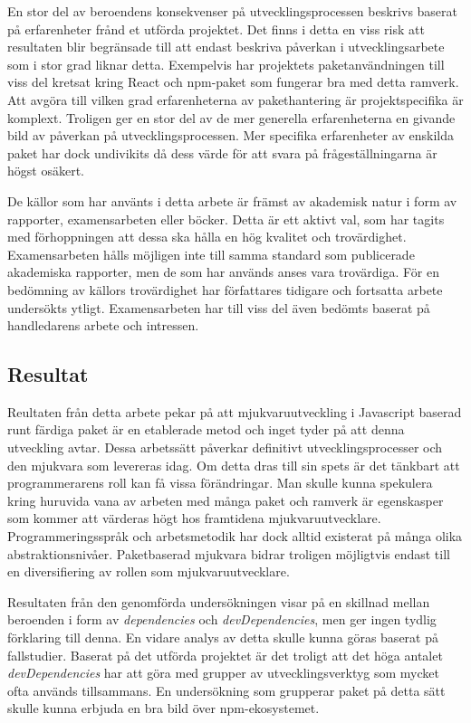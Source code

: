 En stor del av beroendens konsekvenser på utvecklingsprocessen beskrivs baserat på erfarenheter frånd et utförda projektet. Det finns i detta en viss risk att resultaten blir begränsade till att endast beskriva påverkan i utvecklingsarbete som i stor grad liknar detta. Exempelvis har projektets paketanvändningen till viss del kretsat kring React och npm-paket som fungerar bra med detta ramverk. Att avgöra till vilken grad erfarenheterna av pakethantering är projektspecifika är komplext. Troligen ger en stor del av de mer generella erfarenheterna en givande bild av påverkan på utvecklingsprocessen. Mer specifika erfarenheter av enskilda paket har dock undivikits då dess värde för att svara på frågeställningarna är högst osäkert.

De källor som har använts i detta arbete är främst av akademisk natur i form av rapporter, examensarbeten eller böcker. Detta är ett aktivt val, som har tagits med förhoppningen att dessa ska hålla en hög kvalitet och trovärdighet. Examensarbeten hålls möjligen inte till samma standard som publicerade akademiska rapporter, men de som har används anses vara trovärdiga. För en bedömning av källors trovärdighet har författares tidigare och fortsatta arbete undersökts ytligt. Examensarbeten har till viss del även bedömts baserat på handledarens arbete och intressen.

\subsection{Resultat}
\label{subsec:tim-discussion-results}
Reultaten från detta arbete pekar på att mjukvaruutveckling i Javascript baserad runt färdiga paket är en etablerade metod och inget tyder på att denna utveckling avtar. Dessa arbetssätt påverkar definitivt utvecklingsprocesser och den mjukvara som levereras idag. Om detta dras till sin spets är det tänkbart att programmerarens roll kan få vissa förändringar. Man skulle kunna spekulera kring huruvida vana av arbeten med många paket och ramverk är egenskasper som kommer att värderas högt hos framtidena mjukvaruutvecklare. Programmeringsspråk och arbetsmetodik har dock alltid existerat på många olika abstraktionsnivåer. Paketbaserad mjukvara bidrar troligen möjligtvis endast till en diversifiering av rollen som  mjukvaruutvecklare.

Resultaten från den genomförda undersökningen visar på en skillnad mellan beroenden i form av \textit{dependencies} och \textit{devDependencies}, men ger ingen tydlig förklaring till denna. En vidare analys av detta skulle kunna göras baserat på fallstudier. Baserat på det utförda projektet är det troligt att det höga antalet \textit{devDependencies} har att göra med grupper av utvecklingsverktyg som mycket ofta används tillsammans. En undersökning som  grupperar paket på detta sätt skulle kunna erbjuda en bra bild över npm-ekosystemet.

